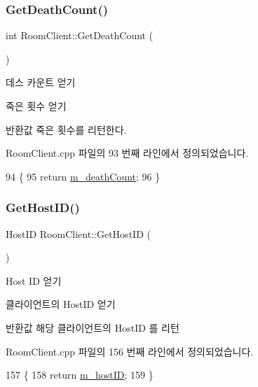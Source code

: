 \subsubsection{\texorpdfstring{Get\+Death\+Count()}{GetDeathCount()}}
{\footnotesize\ttfamily int Room\+Client\+::\+Get\+Death\+Count (\begin{DoxyParamCaption}{ }\end{DoxyParamCaption})}



데스 카운트 얻기 

죽은 횟수 얻기

\begin{DoxyReturn}{반환값}
죽은 횟수를 리턴한다. 
\end{DoxyReturn}


Room\+Client.\+cpp 파일의 93 번째 라인에서 정의되었습니다.


\begin{DoxyCode}
94 \{
95     \textcolor{keywordflow}{return} \hyperlink{class_room_client_a4427d3725926876237d44ae4b088c57f}{m\_deathCount};
96 \}
\end{DoxyCode}
\mbox{\label{class_room_client_abd9ca9b40211167cd5c995a628cb7c23}} 
\subsubsection{\texorpdfstring{Get\+Host\+I\+D()}{GetHostID()}}
{\footnotesize\ttfamily Host\+ID Room\+Client\+::\+Get\+Host\+ID (\begin{DoxyParamCaption}{ }\end{DoxyParamCaption})}



Host ID 얻기 

클라이언트의 Host\+ID 얻기

\begin{DoxyReturn}{반환값}
해당 클라이언트의 Host\+ID 를 리턴 
\end{DoxyReturn}


Room\+Client.\+cpp 파일의 156 번째 라인에서 정의되었습니다.


\begin{DoxyCode}
157 \{
158     \textcolor{keywordflow}{return} \hyperlink{class_room_client_a44db06515969e9ef7d4fad346bc01a7c}{m\_hostID}; 
159 \}
\end{DoxyCode}
\mbox{\label{class_room_client_a5f65e0e924f26ebbc6f14721655a0af4}} 
